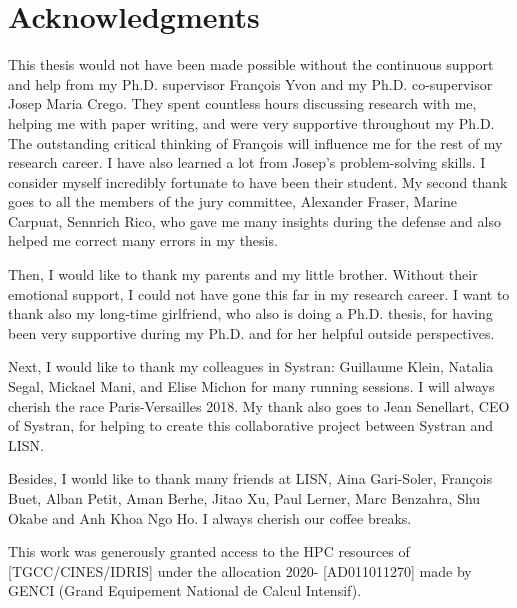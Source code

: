 \chapter*{Acknowledgments}
This thesis would not have been made possible without the continuous support and help from my Ph.D. supervisor François Yvon and my Ph.D. co-supervisor Josep Maria Crego. They spent countless hours discussing research with me, helping me with paper writing, and were very supportive throughout my Ph.D. The outstanding critical thinking of François will influence me for the rest of my research career. I have also learned a lot from Josep's problem-solving skills. I consider myself incredibly fortunate to have been their student. My second thank goes to all the members of the jury committee, Alexander Fraser, Marine Carpuat, Sennrich Rico, who gave me many insights during the defense and also helped me correct many errors in my thesis.

Then, I would like to thank my parents and my little brother. Without their emotional support, I could not have gone this far in my research career. I want to thank also my long-time girlfriend, who also is doing a Ph.D. thesis, for having been very supportive during my Ph.D. and for her helpful outside perspectives.

Next, I would like to thank my colleagues in Systran: Guillaume Klein, Natalia Segal, Mickael Mani, and Elise Michon for many running sessions. I will always cherish the race Paris-Versailles 2018. My thank also goes to Jean Senellart, CEO of Systran, for helping to create this collaborative project between Systran and LISN. 

Besides, I would like to thank many friends at LISN,  Aina Gari-Soler, François Buet, Alban Petit, Aman Berhe, Jitao Xu, Paul Lerner, Marc Benzahra, Shu Okabe and Anh Khoa Ngo Ho. I always cherish our coffee breaks.

This work was generously granted access to the HPC resources of [TGCC/CINES/IDRIS] under the allocation 2020- [AD011011270] made by GENCI (Grand Equipement National de Calcul Intensif).
